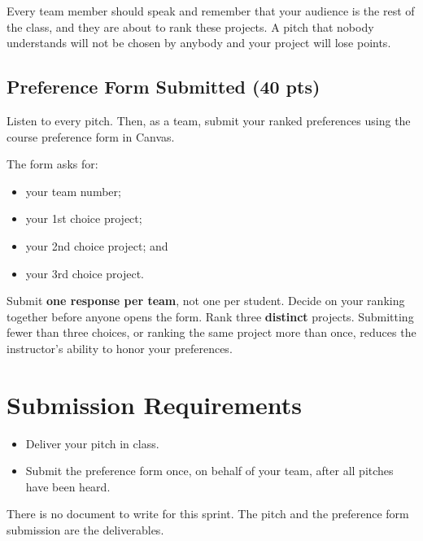 \documentclass[11pt]{article}
\begin{document}
Every team member should speak and remember that your audience is the rest of the class, and they are about to rank these projects. A pitch that nobody understands will not be chosen by anybody and your project will lose points.

\subsection{Preference Form Submitted (40 pts)}

Listen to every pitch. Then, as a team, submit your ranked preferences using the course preference form in Canvas.

The form asks for:

\begin{itemize}
    \item your team number;
    \item your 1st choice project;
    \item your 2nd choice project; and
    \item your 3rd choice project.
\end{itemize}

Submit \textbf{one response per team}, not one per student. Decide on your ranking together before anyone opens the form. Rank three \textbf{distinct} projects. Submitting fewer than three choices, or ranking the same project more than once, reduces the instructor's ability to honor your preferences.

\section{Submission Requirements}

\begin{itemize}
    \item Deliver your pitch in class.
    \item Submit the preference form once, on behalf of your team, after all pitches have been heard.
\end{itemize}

There is no document to write for this sprint. The pitch and the preference form submission are the deliverables.
\end{document}
